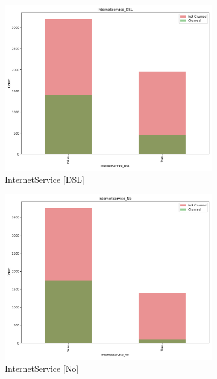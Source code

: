 \documentclass[a4paper,11pt]{article}
\begin{document}
\begin{landscape}
\begin{figure}
    \begin{subfigure}{0.13\linewidth}
        \includegraphics[width=\linewidth]{figures/understanding/InternetService_DSL.pdf}
        \caption{InternetService [DSL]}
    \end{subfigure}
    \begin{subfigure}{0.14\linewidth}
        \includegraphics[width=\linewidth]{figures/understanding/InternetService_No.pdf}
        \caption{InternetService [No]}
    \end{subfigure}
    \begin{subfigure}{0.14\linewidth}

\end{subfigure}
\end{figure}
\end{landscape}
\end{document}
